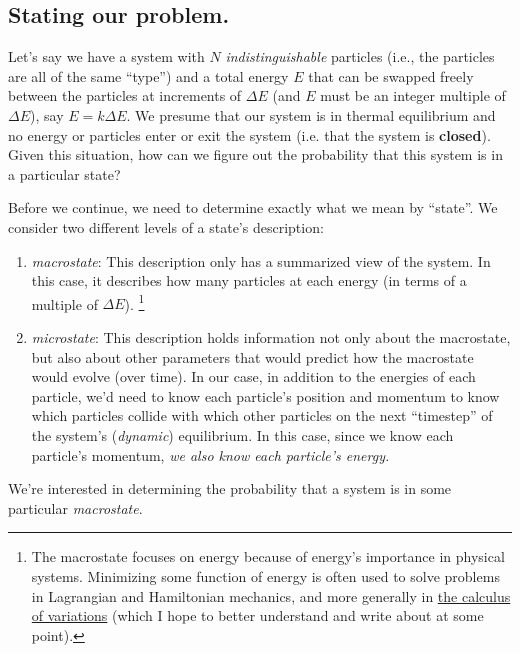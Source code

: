 \documentclass[letterpaper,12pt]{report}
\providecommand{\tightlist}{%
  \setlength{\itemsep}{0pt}\setlength{\parskip}{0pt}}
\begin{document}
\subsection{Stating our problem.}

Let's say we have a system with \(N\) \emph{indistinguishable}
particles 
(i.e., the particles are all of the same ``type'') 
and a total energy
\(E\) that can be swapped freely between the particles at increments of \(\Delta E\) (and
\(E\) must be an integer multiple of \(\Delta E\)), say
\(E = k\Delta E\). We presume that our system is in 
thermal equilibrium and no energy or particles enter or exit the system (i.e. that the system
is \textbf{closed}). Given this situation, how can we figure out the probability
that this system is in a particular state?


Before we continue, we need to determine exactly what we mean by ``state''. We consider
two different levels of a state's description:
\begin{enumerate}
  \tightlist
  \item
    \emph{macrostate}: This description only has a summarized view of the system. In this case,
      it describes how many particles at each energy (in terms of a multiple of \(\Delta E\)).
      \footnote{
      The macrostate focuses on energy because of energy's importance in physical systems.
      Minimizing some function of energy is often used to solve problems in Lagrangian and
      Hamiltonian mechanics, and more generally in
      \href{https://en.wikipedia.org/wiki/Calculus_of_variations}{the calculus of variations}
      (which I hope to better understand and write about at some point).
      }
  \item 
    \emph{microstate}: This description holds information not only about the macrostate,
      but also about other parameters that would predict how the macrostate would evolve
      (over time). In our case, in addition to the
      energies of each particle, 
      we'd need to know each particle's position and momentum to know which particles collide
      with which other particles on the next ``timestep'' of the system's (\emph{dynamic})
      equilibrium. In this case, since we know each particle's momentum, 
      \emph{we also know each particle's energy.}
\end{enumerate}

We're interested in determining the probability that a system is in some particular
\emph{macrostate}.
\end{document}
